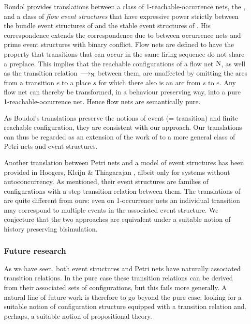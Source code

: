 \documentclass[twocolumn]{article}
\newcommand{\phrase}[1]{\index{#1}{\em #1}}		\newcommand{\implies}{\Rightarrow}
\begin{document}
{\sc Boudol} \cite{Bo90} provides translations between a class of
1-reachable-occurrence nets, the \phrase{flow nets}, and a class of {\em
flow event structures} that have expressive power strictly between
the bundle event structures of \cite{Lk92} and the stable event
structures of \cite{Wi89}.  His correspondence extends the
correspondence due to \cite{NPW81} between occurrence nets and prime
event structures with binary conflict.  Flow nets are defined to have
the property that transitions that can occur in the same firing
sequence do not share a preplace. This implies that the reachable
configurations of a flow net ${\rm N}$, as well as the transition relation
$\stackrel{}{\longrightarrow}_{\rm N}$ between them, are unaffected by omitting the arcs from a
transition $e$ to a place $s$ for which there also is an arc from $s$
to $e$. Any flow net can thereby be transformed, in a behaviour
preserving way, into a pure 1-reachable-occurrence net. Hence flow
nets are semantically pure.

As Boudol's translations preserve the notions of event (= transition)
and finite reachable configuration, they are consistent with our
approach. Our translations can thus be regarded as an extension of the
work of \cite{Bo90} to a more general class of Petri nets and event
structures.

Another translation between Petri nets and a model of event
structures has been provided in {\sc Hoogers, Kleijn \& Thiagarajan}
\cite{HKT96}, albeit only for systems without autoconcurrency.  As
mentioned, their event structures are families of configurations with
a step transition relation between them. The translations of
\cite{HKT96} are quite different from ours: even on 1-occurrence nets
an individual transition may correspond to multiple events in the
associated event structure.  We conjecture that the two approaches are
equivalent under a suitable notion of history preserving bisimulation.

\subsubsection*{Future research}

As we have seen, both event structures and Petri nets
have naturally associated transition relations. In the pure case these
transition relations can be derived from their associated sets of
configurations, but this fails more generally. A natural line of future work
is therefore to go beyond the pure case, looking for a suitable notion of
configuration structure equipped with a transition relation and, perhaps, a
suitable notion of propositional theory.
\end{document}
